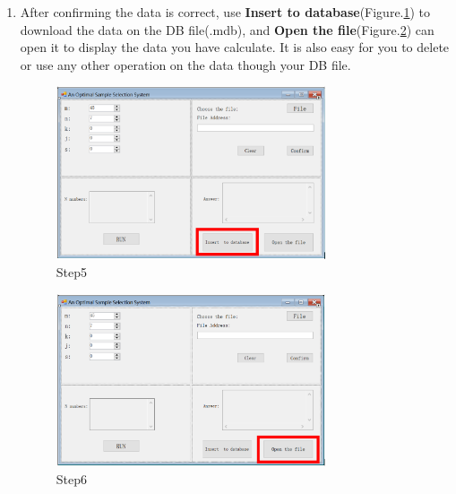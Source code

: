 \begin{enumerate}
\item After confirming the data is correct, use \textbf{Insert to database}(Figure.\ref{fig:st5}) 
to download the data on the DB file(\*.mdb), and \textbf{Open the file}(Figure.\ref{fig:st6}) can open it to display the data you have calculate. 
It is also easy for you to delete or use any other operation on the data though your DB file.
\begin{figure}[!htbp]
	\centering
	\includegraphics[width=0.75\textwidth]{images/step5.png}
	\caption{Step5}
	\label{fig:st5}
\end{figure}
\begin{figure}[!htbp]
	\centering
	\includegraphics[width=0.75\textwidth]{images/step6.png}
	\caption{Step6}
	\label{fig:st6}
\end{figure}

\end{enumerate}